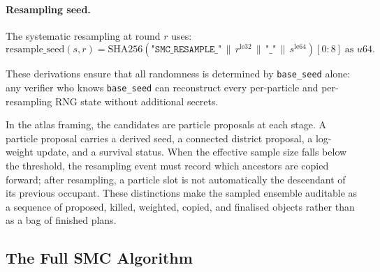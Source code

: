 \paragraph{Resampling seed.}
The systematic resampling at round $r$ uses:
\[
  \mathrm{resample\_seed}(s, r)
  = \mathrm{SHA256}\!\left(
    \texttt{"SMC\_RESAMPLE\_"} \,\|\, r^{\mathrm{le32}}
    \,\|\, \texttt{"\_"} \,\|\, s^{\mathrm{le64}}
  \right)[0{:}8] \;\text{as } u64.
\]

These derivations ensure that all randomness is determined by \texttt{base\_seed}
alone: any verifier who knows \texttt{base\_seed} can reconstruct every
per-particle and per-resampling RNG state without additional secrets.

In the atlas framing, the candidates are particle proposals at each stage.
A particle proposal carries a derived seed, a connected district proposal,
a log-weight update, and a survival status.
When the effective sample size falls below the threshold, the resampling event
must record which ancestors are copied forward; after resampling, a particle
slot is not automatically the descendant of its previous occupant.
These distinctions make the sampled ensemble auditable as a sequence of
proposed, killed, weighted, copied, and finalised objects rather than as a
bag of finished plans.

\subsection{The Full SMC Algorithm}

